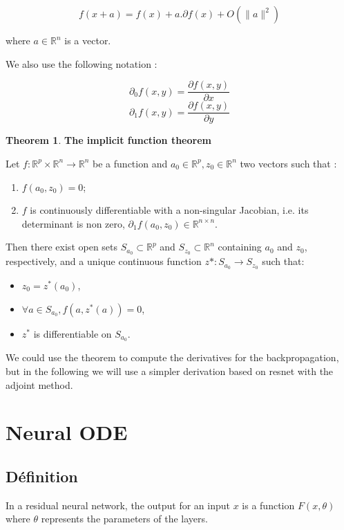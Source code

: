\documentclass[10pt,a4paper]{article}
\theoremstyle{definition}
\theoremstyle{definition}
\newtheorem{theorem}{Theorem}
\begin{document}
\[ f(x + a) = f(x) + a . \partial f(x) + O(\| a\|^2) \]


where $a \in \mathbb{R}^n$ is a vector.

We also use the following notation :

\[ \partial_0 f(x,y) = \frac{\partial f(x,y)}{\partial x}  \]
\[ \partial_1 f(x,y) = \frac{\partial f(x,y)}{\partial y}  \]

\begin{theorem}{\textbf{The implicit function theorem}}

Let $f: \mathbb{R}^p \times \mathbb{R}^n \rightarrow \mathbb{R}^n$ be a function and $a_0 \in \mathbb{R}^p , z_0 \in \mathbb{R}^n$ two vectors such that :

\begin{enumerate}
\item $f(a_0,z_0) = 0$;
\item $f$ is continuously differentiable with a non-singular Jacobian, i.e. its determinant is non zero, $\partial_1 f(a_0,z_0) \in \mathbb{R}^{n \times n}$.
\end{enumerate}
Then there exist open sets $S_{a_0} \subset \mathbb{R}^p$ and $S_{z_0} \subset \mathbb{R}^n$ containing $a_0$ and $z_0$, respectively, and a unique continuous function $z*:S_{a_0} \rightarrow S_{z_0}$ such that:
\begin{itemize}
\item $z_0=z^*(a_0)$,
\item $ \forall a \in S_{a_0}, f(a,z^*(a))=0$,
\item $z^*$ is differentiable on $S_{a_0}$.
\end{itemize}
\end{theorem}

We could use the theorem to compute the derivatives for the backpropagation, but in the following we will use a simpler derivation based on resnet with the adjoint method.

\section{Neural ODE}

\subsection{Définition}


In a residual neural network, the output for an input $x$ is a function $F(x, \theta)$ where $\theta$ represents the parameters of the layers. 
\end{document}
